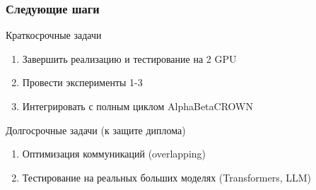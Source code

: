\begin{frame}
\frametitle{Следующие шаги}

\begin{block}{Краткосрочные задачи}
\begin{enumerate}
    \item Завершить реализацию и тестирование на 2 GPU
    \item Провести эксперименты 1-3
    \item Интегрировать с полным циклом AlphaBetaCROWN
\end{enumerate}
\end{block}

\vspace{0.3cm}

\begin{block}{Долгосрочные задачи (к защите диплома)}
\begin{enumerate}
    \item Оптимизация коммуникаций (overlapping)
    \item Тестирование на реальных больших моделях (Transformers, LLM)
\end{enumerate}
\end{block}

\end{frame}